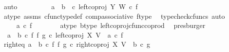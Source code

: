 \begin{isabellebody}
\ auto\isanewline
\ \ \ \ \isamarkupfalse%
\ \isamarkupfalse%
\ {\isachardoublequoteopen}{\isachardot}{\kern0pt}{\isachardot}{\kern0pt}{\isachardot}{\kern0pt}\ {\isacharequal}{\kern0pt}\ {\isacharparenleft}{\kern0pt}{\isacharparenleft}{\kern0pt}a\ {\isasymamalg}\ b{\isacharparenright}{\kern0pt}\ \ {\isasymcirc}\isactrlsub c\ left{\isacharunderscore}{\kern0pt}coproj\ Y\ W{\isacharparenright}{\kern0pt}\ {\isasymcirc}\isactrlsub c\ f{\isachardoublequoteclose}\isanewline
\ \ \ \ \ \ \isamarkupfalse%
\ a{\isacharunderscore}{\kern0pt}type\ assms{\isacharparenleft}{\kern0pt}{}{\isacharparenright}{\kern0pt}\ cfunc{\isacharunderscore}{\kern0pt}type{\isacharunderscore}{\kern0pt}def\ comp{\isacharunderscore}{\kern0pt}associative\ f{\isacharunderscore}{\kern0pt}type\ \isamarkupfalse%
\ {\isacharparenleft}{\kern0pt}typecheck{\isacharunderscore}{\kern0pt}cfuncs{\isacharcomma}{\kern0pt}\ auto{\isacharparenright}{\kern0pt}\isanewline
\ \ \ \ \isamarkupfalse%
\ \isamarkupfalse%
\ {\isachardoublequoteopen}{\isachardot}{\kern0pt}{\isachardot}{\kern0pt}{\isachardot}{\kern0pt}\ {\isacharequal}{\kern0pt}\ {\isacharparenleft}{\kern0pt}a\ {\isasymcirc}\isactrlsub c\ f{\isacharparenright}{\kern0pt}{\isachardoublequoteclose}\isanewline
\ \ \ \ \ \ \isamarkupfalse%
\ a{\isacharunderscore}{\kern0pt}type\ b{\isacharunderscore}{\kern0pt}type\ left{\isacharunderscore}{\kern0pt}coproj{\isacharunderscore}{\kern0pt}cfunc{\isacharunderscore}{\kern0pt}coprod\ \isamarkupfalse%
\ presburger\isanewline
\ \ \ \ \isamarkupfalse%
\ \isamarkupfalse%
\ \ {\isachardoublequoteopen}{\isacharparenleft}{\kern0pt}a\ {\isasymamalg}\ b\ {\isasymcirc}\isactrlsub c\ f\ {\isasymbowtie}\isactrlsub f\ g{\isacharparenright}{\kern0pt}\ {\isasymcirc}\isactrlsub c\ left{\isacharunderscore}{\kern0pt}coproj\ X\ V\ {\isacharequal}{\kern0pt}\ {\isacharparenleft}{\kern0pt}a\ {\isasymcirc}\isactrlsub c\ f{\isacharparenright}{\kern0pt}{\isachardoublequoteclose}\isacommand{{\isachardot}{\kern0pt}}\isamarkupfalse%
\isanewline
\ \ \isamarkupfalse%
\isanewline
\isanewline
\ \ \isamarkupfalse%
\ right{\isacharunderscore}{\kern0pt}eq{\isacharcolon}{\kern0pt}\ {\isachardoublequoteopen}{\isacharparenleft}{\kern0pt}a\ {\isasymamalg}\ b\ {\isasymcirc}\isactrlsub c\ f\ {\isasymbowtie}\isactrlsub f\ g{\isacharparenright}{\kern0pt}\ {\isasymcirc}\isactrlsub c\ right{\isacharunderscore}{\kern0pt}coproj\ X\ V\ {\isacharequal}{\kern0pt}\ {\isacharparenleft}{\kern0pt}b\ {\isasymcirc}\isactrlsub c\ g{\isacharparenright}{\kern0pt}{\isachardoublequoteclose}\isanewline

\end{isabellebody}
